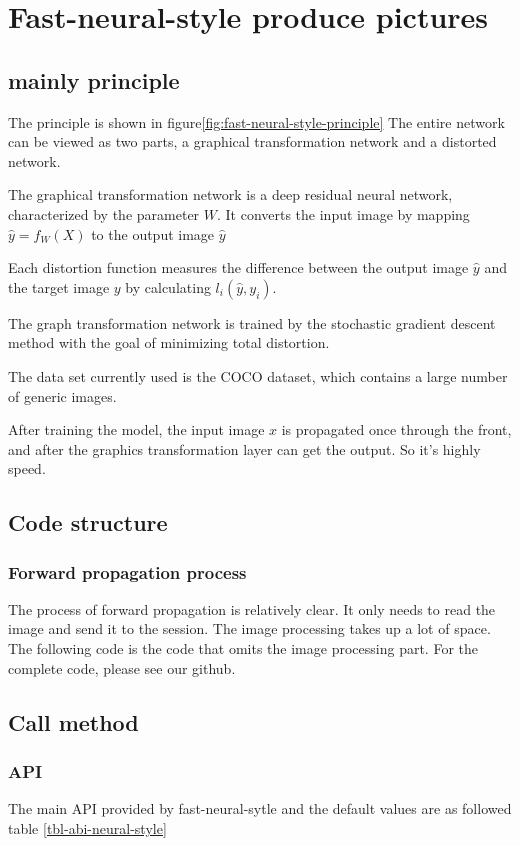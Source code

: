 \section{Fast-neural-style produce pictures}
\subsection{mainly principle}
The principle is shown in figure\ref{fig:fast-neural-style-principle}
The entire network can be viewed as two parts, a graphical transformation network and a distorted network.

The graphical transformation network is a deep residual neural network, characterized by the parameter $W$. It converts the input image by mapping $\hat y=f_W(X)$ to the output image $\hat y$

Each distortion function measures the difference between the output image $\hat y$ and the target image $y$ by calculating $l_i(\hat y,y_i)$.

The graph transformation network is trained by the stochastic gradient descent method with the goal of minimizing total distortion.

The data set currently used is the COCO dataset, which contains a large number of generic images.

After training the model, the input image $x$ is propagated once through the front, and after the graphics transformation layer can get the output. So it's highly speed.
\subsection{Code structure}
\subsubsection{Forward propagation process}
The process of forward propagation is relatively clear. It only needs to read the image and send it to the session. The image processing takes up a lot of space. The following code is the code that omits the image processing part. For the complete code, please see our github.\cite{my-fast-neural-sytle-tensorflow}

\subsection{Call method}
\subsubsection{API}
The main API provided by fast-neural-sytle and the default values are as followed table \ref{tbl-abi-neural-style}
